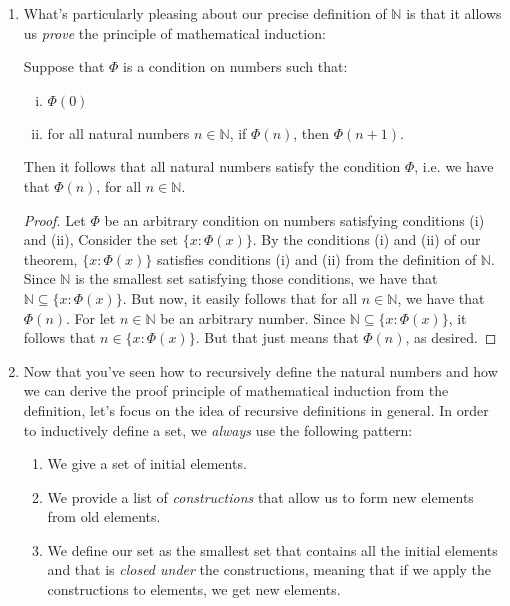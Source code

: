 \begin{enumerate}[{\thesection}.1]
\item What's particularly pleasing about our precise definition of $\mathbb{N}$ is that it allows us \emph{prove} the principle of mathematical induction:
	
	\begin{theorem}
	Suppose that $\Phi$ is a condition on numbers such that:
		\begin{enumerate}[(i)]
		
			\item $\Phi(0)$
			
			\item for all natural numbers $n\in\mathbb{N}$, if $\Phi(n)$, then $\Phi(n+1)$.
		
		\end{enumerate}	
		Then it follows that all natural numbers satisfy the condition $\Phi$, i.e. we have that $\Phi(n)$, for all $n\in \mathbb{N}$.
	\end{theorem}
	\begin{proof}
	Let $\Phi$ be an arbitrary condition on numbers satisfying conditions (i) and (ii), Consider the set $\{x:\Phi(x)\}$. By the conditions (i) and (ii) of our theorem, $\{x:\Phi(x)\}$ satisfies conditions (i) and (ii) from the definition of $\mathbb{N}$. Since $\mathbb{N}$ is the smallest set satisfying those conditions, we have that $\mathbb{N}\subseteq\{x:\Phi(x)\}$. But now, it easily follows that for all $n\in\mathbb{N}$, we have that $\Phi(n)$. For let $n\in\mathbb{N}$ be an arbitrary number. Since $\mathbb{N}\subseteq\{x:\Phi(x)\}$, it follows that $n\in\{x:\Phi(x)\}$. But that just means that $\Phi(n)$, as desired.
	\end{proof}

\item Now that you've seen how to recursively define the natural numbers and how we can derive the proof principle of mathematical induction from the definition, let's focus on the idea of recursive definitions in general. In order to inductively define a set, we \emph{always} use the following pattern:
	\begin{enumerate}[1.]
	
		\item We give a set of initial elements.
		
		\item We provide a list of \emph{constructions} that allow us to form new elements from old elements.
		
		\item We define our set as the smallest set that contains all the initial elements and that is \emph{closed under} the constructions, meaning that if we apply the constructions to elements, we get new elements.
	

\end{enumerate}
\end{enumerate}
